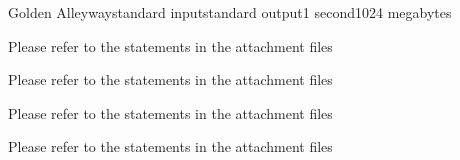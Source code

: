 \begin{problem}{Golden Alleyway}{standard input}{standard output}{1 second}{1024 megabytes}

Please refer to the statements in the attachment files

\InputFile
Please refer to the statements in the attachment files

\OutputFile
Please refer to the statements in the attachment files

\Examples

\begin{example}
%
%
\end{example}

\Note
Please refer to the statements in the attachment files

\end{problem}

